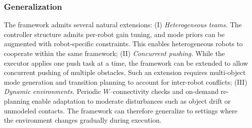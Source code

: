 \subsubsection{Generalization}\label{subsec:general}
The framework admits several natural extensions:
(I) \textit{Heterogeneous teams.} The controller structure admits per-robot gain
tuning, and mode priors can be augmented with robot-specific constraints.
This enables heterogeneous robots to cooperate within the same framework;
(II) \textit{Concurrent pushing.} While the executor applies one push task at a
time, the framework can be extended to allow concurrent pushing of multiple
obstacles. Such an extension requires multi-object mode generation and
transition planning to account for inter-robot conflicts;
(III) \textit{Dynamic environments.} Periodic $W$--connectivity checks and
on-demand re-planning enable adaptation to moderate disturbances such as object
drift or unmodeled contacts. The framework can therefore generalize to settings
where the environment changes gradually during execution.
